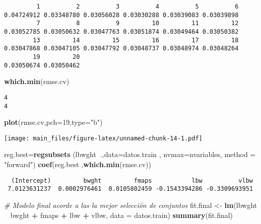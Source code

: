 \documentclass[]{article}
\newenvironment{Shaded}{\begin{snugshade}}{\end{snugshade}}
\newcommand{\KeywordTok}[1]{\textcolor[rgb]{0.13,0.29,0.53}{\textbf{#1}}}
\newcommand{\DataTypeTok}[1]{\textcolor[rgb]{0.13,0.29,0.53}{#1}}
\newcommand{\DecValTok}[1]{\textcolor[rgb]{0.00,0.00,0.81}{#1}}
\newcommand{\StringTok}[1]{\textcolor[rgb]{0.31,0.60,0.02}{#1}}
\newcommand{\CommentTok}[1]{\textcolor[rgb]{0.56,0.35,0.01}{\textit{#1}}}
\newcommand{\OperatorTok}[1]{\textcolor[rgb]{0.81,0.36,0.00}{\textbf{#1}}}
\newcommand{\NormalTok}[1]{#1}
\begin{document}
\begin{verbatim}
         1          2          3          4          5          6 
0.04724912 0.03348780 0.03056028 0.03030288 0.03039083 0.03039898 
         7          8          9         10         11         12 
0.03052785 0.03050632 0.03047763 0.03051874 0.03049464 0.03050382 
        13         14         15         16         17         18 
0.03047868 0.03047105 0.03047792 0.03048737 0.03048974 0.03048264 
        19         20 
0.03050674 0.03050462 
\end{verbatim}

\begin{Shaded}
\begin{Highlighting}[]
\KeywordTok{which.min}\NormalTok{(rmse.cv)}
\end{Highlighting}
\end{Shaded}

\begin{verbatim}
4 
4 
\end{verbatim}

\begin{Shaded}
\begin{Highlighting}[]
\KeywordTok{plot}\NormalTok{(rmse.cv,}\DataTypeTok{pch=}\DecValTok{19}\NormalTok{,}\DataTypeTok{type=}\StringTok{"b"}\NormalTok{)}
\end{Highlighting}
\end{Shaded}

\texttt{[image: main\_files/figure-latex/unnamed-chunk-14-1.pdf]}

\begin{Shaded}
\begin{Highlighting}[]
\NormalTok{reg.best=}\KeywordTok{regsubsets}\NormalTok{ (lbwght}\OperatorTok{~}\NormalTok{.,}\DataTypeTok{data=}\NormalTok{datos.train , }\DataTypeTok{nvmax=}\NormalTok{nvariables, }\DataTypeTok{method =} \StringTok{"forward"}\NormalTok{)}
\KeywordTok{coef}\NormalTok{(reg.best ,}\KeywordTok{which.min}\NormalTok{(rmse.cv))}
\end{Highlighting}
\end{Shaded}

\begin{verbatim}
  (Intercept)         bwght         fmaps           lbw          vlbw 
 7.0123631237  0.0002976461  0.0105802459 -0.1543394286 -0.3309693951 
\end{verbatim}

\begin{Shaded}
\begin{Highlighting}[]
\CommentTok{# Modelo final acorde a las la mejor selección de conjuntos}
\NormalTok{fit.final <-}\StringTok{ }\KeywordTok{lm}\NormalTok{(lbwght }\OperatorTok{~}\StringTok{ }\NormalTok{bwght }\OperatorTok{+}\StringTok{ }\NormalTok{fmaps }\OperatorTok{+}\StringTok{ }\NormalTok{lbw }\OperatorTok{+}\StringTok{ }\NormalTok{vlbw, }\DataTypeTok{data =}\NormalTok{ datos.train)}
\KeywordTok{summary}\NormalTok{(fit.final)}
\end{Highlighting}
\end{Shaded}
\end{document}
